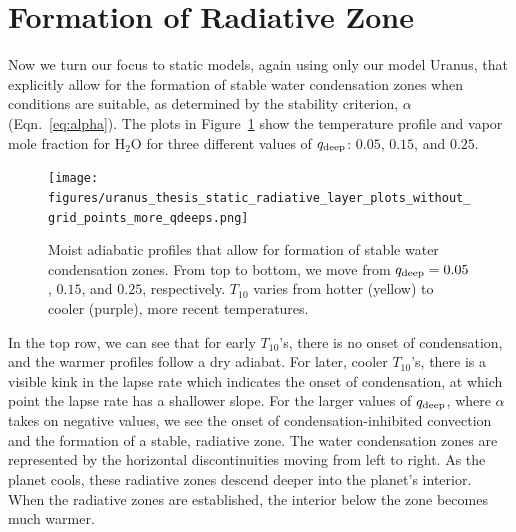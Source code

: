 \documentclass[11pt]{ucscthesisbs}
\begin{document}
\section{Formation of Radiative Zone}
Now we turn our focus to static models, again using only our model Uranus, that explicitly allow for the formation of stable water condensation zones when conditions are suitable, as determined by the stability criterion, $\alpha$ (Eqn.~\ref{eq:alpha}). The plots in Figure~\ref{fig:radiative} show the temperature profile and vapor mole fraction for H$_{2}$O for three different values of $q_{\rm deep}$: $0.05$, $0.15$, and $0.25$. 
\begin{figure}[ht]
 \centerline{
  \texttt{[image: figures/uranus\_thesis\_static\_radiative\_layer\_plots\_without\_grid\_points\_more\_qdeeps.png]}
 }{}
\caption[Formation of Radiative Zone]
{Moist adiabatic profiles that allow for formation of stable water condensation zones. From top to bottom, we move from $q_{\rm deep} = 0.05$, $0.15$, and $0.25$, respectively. $T_{10}$ varies from hotter (yellow) to cooler (purple), more recent temperatures.}
\label{fig:radiative}
\end{figure}
In the top row, we can see that for early $T_{10}$'s, there is no onset of condensation, and the warmer profiles follow a dry adiabat. For later, cooler $T_{10}$'s, there is a visible kink in the lapse rate which indicates the onset of condensation, at which point the lapse rate has a shallower slope. For the larger values of $q_{\rm deep}$, where $\alpha$ takes on negative values, we see the onset of condensation-inhibited convection and the formation of a stable, radiative zone. The water condensation zones ar{}e represented by the horizontal discontinuities moving from left to right. As the planet cools, these radiative zones descend deeper into the planet's interior. When the radiative zones are established, the interior below the zone becomes much warmer. 
\end{document}
